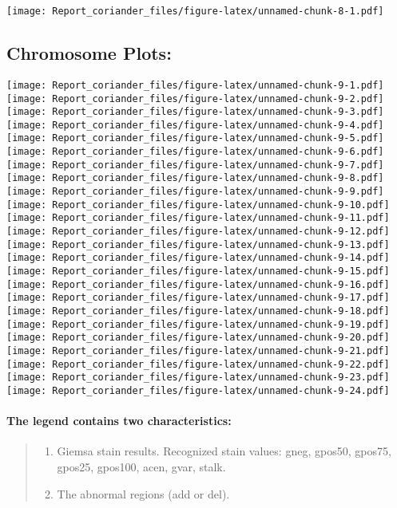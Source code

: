 \documentclass[]{article}
\providecommand{\tightlist}{%
  \setlength{\itemsep}{0pt}\setlength{\parskip}{0pt}}
\let\oldparagraph\paragraph
\renewcommand{\paragraph}[1]{\oldparagraph{#1}\mbox{}}
\begin{document}
\texttt{[image: Report\_coriander\_files/figure-latex/unnamed-chunk-8-1.pdf]}

\hypertarget{chromosome-plots}{%
\subsection{Chromosome Plots:}\label{chromosome-plots}}

\texttt{[image: Report\_coriander\_files/figure-latex/unnamed-chunk-9-1.pdf]}
\texttt{[image: Report\_coriander\_files/figure-latex/unnamed-chunk-9-2.pdf]}
\texttt{[image: Report\_coriander\_files/figure-latex/unnamed-chunk-9-3.pdf]}
\texttt{[image: Report\_coriander\_files/figure-latex/unnamed-chunk-9-4.pdf]}
\texttt{[image: Report\_coriander\_files/figure-latex/unnamed-chunk-9-5.pdf]}
\texttt{[image: Report\_coriander\_files/figure-latex/unnamed-chunk-9-6.pdf]}
\texttt{[image: Report\_coriander\_files/figure-latex/unnamed-chunk-9-7.pdf]}
\texttt{[image: Report\_coriander\_files/figure-latex/unnamed-chunk-9-8.pdf]}
\texttt{[image: Report\_coriander\_files/figure-latex/unnamed-chunk-9-9.pdf]}
\texttt{[image: Report\_coriander\_files/figure-latex/unnamed-chunk-9-10.pdf]}
\texttt{[image: Report\_coriander\_files/figure-latex/unnamed-chunk-9-11.pdf]}
\texttt{[image: Report\_coriander\_files/figure-latex/unnamed-chunk-9-12.pdf]}
\texttt{[image: Report\_coriander\_files/figure-latex/unnamed-chunk-9-13.pdf]}
\texttt{[image: Report\_coriander\_files/figure-latex/unnamed-chunk-9-14.pdf]}
\texttt{[image: Report\_coriander\_files/figure-latex/unnamed-chunk-9-15.pdf]}
\texttt{[image: Report\_coriander\_files/figure-latex/unnamed-chunk-9-16.pdf]}
\texttt{[image: Report\_coriander\_files/figure-latex/unnamed-chunk-9-17.pdf]}
\texttt{[image: Report\_coriander\_files/figure-latex/unnamed-chunk-9-18.pdf]}
\texttt{[image: Report\_coriander\_files/figure-latex/unnamed-chunk-9-19.pdf]}
\texttt{[image: Report\_coriander\_files/figure-latex/unnamed-chunk-9-20.pdf]}
\texttt{[image: Report\_coriander\_files/figure-latex/unnamed-chunk-9-21.pdf]}
\texttt{[image: Report\_coriander\_files/figure-latex/unnamed-chunk-9-22.pdf]}
\texttt{[image: Report\_coriander\_files/figure-latex/unnamed-chunk-9-23.pdf]}
\texttt{[image: Report\_coriander\_files/figure-latex/unnamed-chunk-9-24.pdf]}

\hypertarget{the-legend-contains-two-characteristics}{%
\paragraph{The legend contains two
characteristics:}\label{the-legend-contains-two-characteristics}}

\begin{quote}
\begin{enumerate}
\def\labelenumi{\arabic{enumi}.}
\tightlist
\item
  Giemsa stain results. Recognized stain values: gneg, gpos50, gpos75,
  gpos25, gpos100, acen, gvar, stalk.
\item
  The abnormal regions (add or del).
\end{enumerate}
\end{quote}
\end{document}
